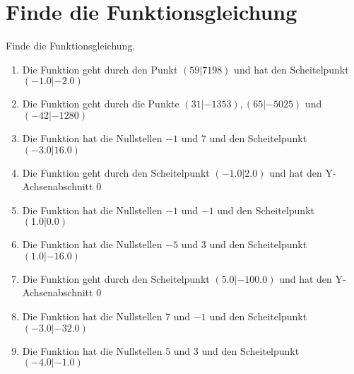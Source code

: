 \documentclass{article}%
\begin{document}
\section{Finde die Funktionsgleichung}%
\label{sec:FindedieFunktionsgleichung}%
Finde die Funktionsgleichung.%
\begin{enumerate}[label=\alph*)]%
\item%
 Die Funktion geht durch den Punkt $(59|7198)$ und hat den Scheitelpunkt $(-1.0|-2.0)$%
\item%
 Die Funktion geht durch die Punkte $(31|-1353),(65|-5025)$ und $(-42|-1280)$%
\item%
 Die Funktion hat die Nullstellen $-1$ und $7$ und den Scheitelpunkt $(-3.0|16.0)$%
\item%
 Die Funktion geht durch den Scheitelpunkt $(-1.0|2.0)$ und hat den Y-Achsenabschnitt $0$%
\item%
 Die Funktion hat die Nullstellen $-1$ und $-1$ und den Scheitelpunkt $(1.0|0.0)$%
\item%
 Die Funktion hat die Nullstellen $-5$ und $3$ und den Scheitelpunkt $(1.0|-16.0)$%
\item%
 Die Funktion geht durch den Scheitelpunkt $(5.0|-100.0)$ und hat den Y-Achsenabschnitt $0$%
\item%
 Die Funktion hat die Nullstellen $7$ und $-1$ und den Scheitelpunkt $(-3.0|-32.0)$%
\item%
 Die Funktion hat die Nullstellen $5$ und $3$ und den Scheitelpunkt $(-4.0|-1.0)$%
\end{enumerate}

%
\end{document}
